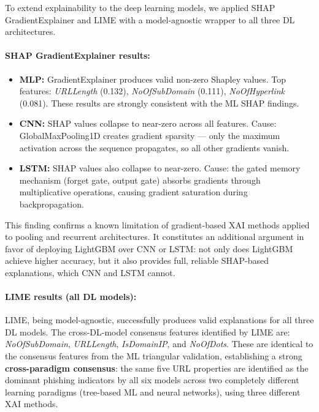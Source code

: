 To extend explainability to the deep learning models, we applied SHAP GradientExplainer and LIME with a model-agnostic wrapper to all three DL architectures.

\paragraph{SHAP GradientExplainer results:}
\begin{itemize}
    \item \textbf{MLP:} GradientExplainer produces valid non-zero Shapley values. Top features: \textit{URLLength} (0.132), \textit{NoOfSubDomain} (0.111), \textit{NoOfHyperlink} (0.081). These results are strongly consistent with the ML SHAP findings.
    \item \textbf{CNN:} SHAP values collapse to near-zero across all features. Cause: GlobalMaxPooling1D creates gradient sparsity — only the maximum activation across the sequence propagates, so all other gradients vanish.
    \item \textbf{LSTM:} SHAP values also collapse to near-zero. Cause: the gated memory mechanism (forget gate, output gate) absorbs gradients through multiplicative operations, causing gradient saturation during backpropagation.
\end{itemize}

This finding confirms a known limitation of gradient-based XAI methods applied to pooling and recurrent architectures. It constitutes an additional argument in favor of deploying LightGBM over CNN or LSTM: not only does LightGBM achieve higher accuracy, but it also provides full, reliable SHAP-based explanations, which CNN and LSTM cannot.

\paragraph{LIME results (all DL models):}
LIME, being model-agnostic, successfully produces valid explanations for all three DL models. The cross-DL-model consensus features identified by LIME are: \textit{NoOfSubDomain}, \textit{URLLength}, \textit{IsDomainIP}, and \textit{NoOfDots}. These are identical to the consensus features from the ML triangular validation, establishing a strong \textbf{cross-paradigm consensus}: the same five URL properties are identified as the dominant phishing indicators by all six models across two completely different learning paradigms (tree-based ML and neural networks), using three different XAI methods.

